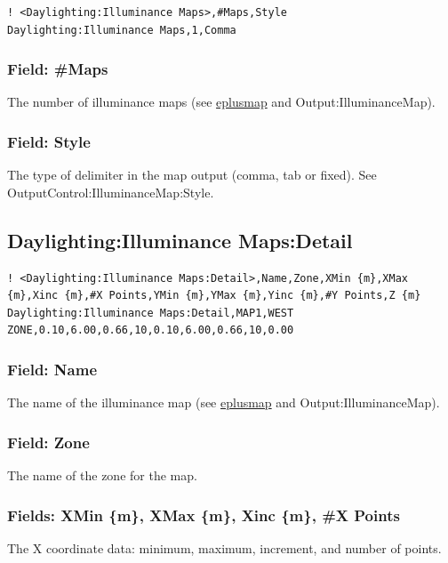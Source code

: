 \begin{lstlisting}
! <Daylighting:Illuminance Maps>,#Maps,Style
Daylighting:Illuminance Maps,1,Comma
\end{lstlisting}

\subsubsection{Field: \#Maps}\label{field-number-maps}
The number of illuminance maps (see \hyperref[eplusmap.ext]{eplusmap} and Output:IlluminanceMap).

\subsubsection{Field: Style}\label{style-maps}
The type of delimiter in the map output (comma, tab or fixed). See OutputControl:IlluminanceMap:Style.

\subsection{Daylighting:Illuminance Maps:Detail}\label{daylighting-illuminace-maps-detail}

\begin{lstlisting}
! <Daylighting:Illuminance Maps:Detail>,Name,Zone,XMin {m},XMax {m},Xinc {m},#X Points,YMin {m},YMax {m},Yinc {m},#Y Points,Z {m}
Daylighting:Illuminance Maps:Detail,MAP1,WEST ZONE,0.10,6.00,0.66,10,0.10,6.00,0.66,10,0.00
\end{lstlisting}

\subsubsection{Field: Name}\label{field-maps-name}
The name of the illuminance map (see \hyperref[eplusmap.ext]{eplusmap} and Output:IlluminanceMap).

\subsubsection{Field: Zone}\label{field-maps-zone}
The name of the zone for the map.

\subsubsection{Fields: XMin \{m\}, XMax \{m\}, Xinc \{m\}, \#X Points}\label{field-maps-xcoords}
The X coordinate data: minimum, maximum, increment, and number of points.

